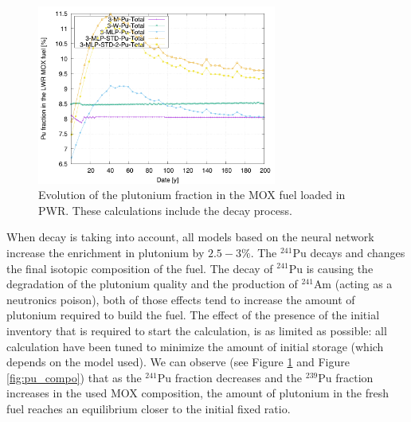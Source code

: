 \documentclass[12pt]{article}
\begin{document}
\begin{figure}[h!]
  \centering
  \includegraphics[width=0.7\textwidth]  {img/C_1_3_MOX_pu_contribution}
  \caption{Evolution of the plutonium fraction in the MOX fuel loaded in PWR.
  These calculations include the decay process.}
  \label{fig:puflow_D}
\end{figure}
%  
%

When decay is taking into account, all models based on the neural network increase the
enrichment in plutonium by $2.5-3\%$. The $^{241}$Pu decays and changes the
final isotopic composition of the fuel.  The decay of $^{241}$Pu is causing the
degradation of the plutonium quality and the production of $^{241}$Am (acting
as a neutronics poison), both of those effects tend to increase the amount of
plutonium required to build the fuel.
The effect of the presence of the initial inventory that is required to start
the calculation, is as limited as possible: all calculation have been tuned to
minimize the amount of initial storage (which depends on the model
used).
We can observe (see Figure \ref{fig:puflow_D} and Figure \ref{fig:pu_compo})
that as the $^{241}$Pu fraction decreases and the $^{239}$Pu fraction increases in
the used MOX composition, the amount of plutonium in the fresh fuel reaches an
equilibrium closer to the initial fixed ratio.
\end{document}
